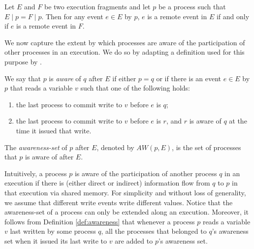\begin{fact}
	Let $E$ and $F$ be two execution fragments and let $p$ be a process such that $E \mid p = F \mid p$. Then for any event $e \in E$ by $p$, $e$ is a remote event in $E$ if and only if $e$ is a remote event in $F$.
\end{fact}

We now capture the extent by which processes are aware of the participation of other processes in an execution. We do so by adapting a definition used for this purpose by \cite{Attiya05timeand}.

\begin{definition}
	We say that $p$ is \emph{aware} of $q$ after $E$ if either $p=q$ or if there is an event $e \in E$ by $p$ that reads a variable $v$ such that one of the following holds:
	\begin{enumerate}
		\item the last process to commit write to $v$ before $e$ is $q$;
		\item the last process to commit write to $v$ before $e$ is $r$, and $r$ is aware of $q$ at the time it issued that write.
	\end{enumerate}
The \emph{awareness-set} of $p$ after $E$, denoted by $AW(p,E)$, is the set of processes that $p$ is aware of after $E$.
\label{def:awareness}
\end{definition}

Intuitively, a process $p$ is aware of the participation of another process $q$ in an execution if there is (either direct or indirect) information flow from $q$ to $p$ in that execution via shared memory. For simplicity and without loss of generality, we assume that different write events write different values. Notice that the awareness-set of a process can only be extended along an execution. Moreover, it follows from Definition \ref{def:awareness} that whenever a process $p$ reads a variable $v$ last written by some process $q$, all the processes that belonged to $q$'s awareness set when it issued its last write to $v$ are added to $p$'s awareness set.

\begin{comment} %
We consider a model in which all the writes (to both local and remote variables) are placed in the write buffer. Our proof, on the other hand, relies only on the assumption that all writes to remote variables may be delayed until a fence is performed, thus the same construction can be used in a model where operations to local variable are committed instantly (at the time they are issued). In such a model, a process is allowed to perform any powerful operation on its local variables (such as CAS and swap). A closer inspection of the construction reviles that we do not interleave local events of different processes, thus any powerful operation can be seen as an atomic serious of reads and writes, and the same proof holds.
\end{comment}

